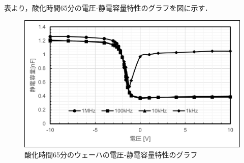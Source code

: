 \documentclass[11pt]{jarticle}
\begin{document}
			表より，酸化時間65分の電圧‐静電容量特性のグラフを図に示す．
			\begin{figure}[H]
			\centering
			\includegraphics[width = 12cm]{figs/wehacap65.png}
			\caption{酸化時間65分のウェーハの電圧‐静電容量特性のグラフ}
			\label{fig:wehacap65}
			\end{figure}
\end{document}
